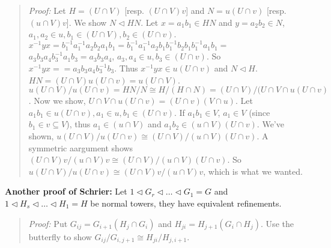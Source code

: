 \begin{quote}
\emph{Proof:}
Let $H= (U \cap V)$ [resp. $(U \cap V)v$] and $N= u(U \cap v)$ [resp. $(u \cap V)v$].
We show $N \lhd HN$.
Let $x= a_1 b_1 \in HN$ and $y = a_2 b_2 \in N$, $a_1, a_2 \in u, b_1 \in (U \cap V), b_2 \in (U \cap v)$.
$x^{-1} y x = b_1^{-1} a_1^{-1} a_2 b_2 a_1 b_1 = b_1^{-1} a_1^{-1} a_2 b_1 b_1^{-1} b_2 b_1 b_1^{-1} a_1 b_1 =$
$a_3 b_3 a_4 b_3^{-1} a_1 b_3 = a_3 b_3 a_4 $, $a_3, a_4 \in u, b_3 \in (U \cap v)$.  So $x^{-1} y x =
= a_3 b_3 a_4 b_3^{-1} b_3$.  Thus $x^{-1} y x \in u(U \cap v)$ and $N \lhd H$.
$HN =(U \cap V)u(U \cap v) = u(U \cap V)$.  $u(U \cap V)/u(U \cap v) = HN/N \cong H/(H \cap N) = (U \cap V)/(U \cap V \cap u(U \cap v)$.
Now we show, $U \cap V \cap u(U \cap v) = (U \cap v) (V \cap u)$.  Let $a_1 b_1 \in u(U \cap v), a_1 \in u, b_1 \in (U \cap v)$.
If $a_1 b_1 \in V$, $a_1 \in V$ (since $b_1 \in v \subseteq V$), thus $a_1 \in (u \cap V)$ and $a_1 b_2 \in (u \cap V) (U \cap v)$.
We've shown, $u(U \cap V)/u(U \cap v) \cong (U \cap V)/(u \cap V)(U \cap v)$.  A symmetric aargument shows
$(U \cap V)v/(u \cap V)v \cong (U \cap V)/(u \cap V)(U \cap v)$.  So $u(U \cap V)/u(U \cap v) \cong (U \cap V)v/(u \cap V)v$,
which is what we wanted.
\end{quote}
{\bf Another proof of Schrier:} Let 
$1 \lhd G_r \lhd \ldots \lhd G_1 = G$ and
$1 \lhd H_s \lhd \ldots \lhd H_1 = H$ be normal towers, they have equivalent refinements.
\begin{quote}
\emph{Proof:}
Put $G_{ij} = G_{i+1}(H_j \cap G_i)$ and $H_{ji} = H_{j+1}(G_i \cap H_j)$.  Use the butterfly to show
$G_{ij}/G_{i,j+1} \cong H_{ji}/H_{j, i+1}$.
\end{quote}
